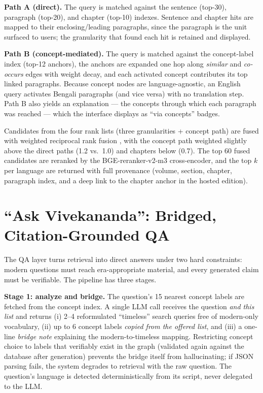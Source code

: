 \documentclass[pdflatex,sn-mathphys-num]{sn-jnl}
\begin{document}
\textbf{Path A (direct).} The query is matched against the sentence
(top-30), paragraph (top-20), and chapter (top-10) indexes. Sentence and
chapter hits are mapped to their enclosing/leading paragraphs, since the
paragraph is the unit surfaced to users; the granularity that found each
hit is retained and displayed.

\textbf{Path B (concept-mediated).} The query is matched against the
concept-label index (top-12 anchors), the anchors are expanded one hop
along \emph{similar} and \emph{co-occurs} edges with weight decay, and
each activated concept contributes its top linked paragraphs. Because
concept nodes are language-agnostic, an English query activates Bengali
paragraphs (and vice versa) with no translation step. Path B also yields
an explanation --- the concepts through which each paragraph was reached
--- which the interface displays as ``via concepts'' badges.

Candidates from the four rank lists (three granularities + concept path)
are fused with weighted reciprocal rank fusion \cite{cormack2009rrf},
with the concept path weighted slightly above the direct paths (1.2 vs.\
1.0) and chapters below (0.7). The top 60 fused candidates are reranked
by the BGE-reranker-v2-m3 cross-encoder, and the top $k$ per language are
returned with full provenance (volume, section, chapter, paragraph index,
and a deep link to the chapter anchor in the hosted edition).

\section{``Ask Vivekananda'': Bridged, Citation-Grounded QA}
\label{sec:qa}

The QA layer turns retrieval into direct answers under two hard
constraints: modern questions must reach era-appropriate material, and
every generated claim must be verifiable. The pipeline has three stages.

\textbf{Stage 1: analyze and bridge.} The question's 15 nearest concept
labels are fetched from the concept index. A single LLM call receives the
question \emph{and this list} and returns (i) 2--4 reformulated
``timeless'' search queries free of modern-only vocabulary, (ii) up to 6
concept labels \emph{copied from the offered list}, and (iii) a one-line
\emph{bridge note} explaining the modern-to-timeless mapping. Restricting
concept choice to labels that verifiably exist in the graph (validated
again against the database after generation) prevents the bridge itself
from hallucinating; if JSON parsing fails, the system degrades to
retrieval with the raw question. The question's language is detected
deterministically from its script, never delegated to the LLM.
\end{document}
